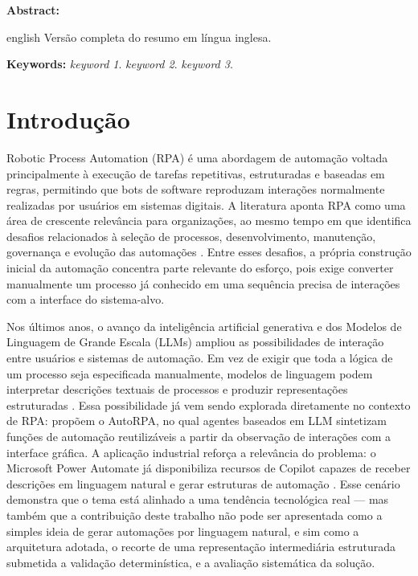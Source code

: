 \documentclass[
	article,
	12pt,
	oneside,
	a4paper,
	section=TITLE,
	english,
	brazil,
	sumario=tradicional
	]{abntex2}
\renewenvironment{resumoumacoluna}[1][\resumoname]{%
	\PRIVATEbookmarkthis{#1}%
	\parindent0pt\relax
	\noindent\textbf{#1:}\par
	\vspace{12pt}
}{%
	\par
	\PRIVATEclearpageifneeded
}
\begin{document}
\renewcommand{\resumoname}{Abstract}
\begin{resumoumacoluna}
\begin{otherlanguage*}{english}
Versão completa do resumo em língua inglesa.

\vspace{\onelineskip}
\noindent
\textbf{Keywords:} \textit{keyword 1}. \textit{keyword 2}. \textit{keyword 3}.
\end{otherlanguage*}
\end{resumoumacoluna}

\textual
\pagestyle{icevheadings}

\section{Introdução}

Robotic Process Automation (RPA) é uma abordagem de automação voltada
principalmente à execução de tarefas repetitivas, estruturadas e baseadas em
regras, permitindo que bots de software reproduzam interações normalmente
realizadas por usuários em sistemas digitais. A literatura aponta RPA como
uma área de crescente relevância para organizações, ao mesmo tempo em que
identifica desafios relacionados à seleção de processos, desenvolvimento,
manutenção, governança e evolução das automações \cite{wewerka2020,
syed2020}. Entre esses desafios, a própria construção inicial da automação
concentra parte relevante do esforço, pois exige converter manualmente um
processo já conhecido em uma sequência precisa de interações com a
interface do sistema-alvo.

Nos últimos anos, o avanço da inteligência artificial generativa e dos
Modelos de Linguagem de Grande Escala (LLMs) ampliou as possibilidades de
interação entre usuários e sistemas de automação. Em vez de exigir que toda
a lógica de um processo seja especificada manualmente, modelos de linguagem
podem interpretar descrições textuais de processos e produzir representações
estruturadas \cite{bettencourt2026}. Essa possibilidade já vem sendo
explorada diretamente no contexto de RPA:  propõem o
AutoRPA, no qual agentes baseados em LLM sintetizam funções de automação
reutilizáveis a partir da observação de interações com a interface gráfica.
A aplicação industrial reforça a relevância do problema: o Microsoft Power
Automate já disponibiliza recursos de Copilot capazes de receber descrições
em linguagem natural e gerar estruturas de automação
\cite{microsoftcopilot2026}. Esse cenário demonstra que o tema está
alinhado a uma tendência tecnológica real --- mas também que a contribuição
deste trabalho não pode ser apresentada como a simples ideia de gerar
automações por linguagem natural, e sim como a arquitetura adotada, o
recorte de uma representação intermediária estruturada submetida a
validação determinística, e a avaliação sistemática da solução.
\end{document}
